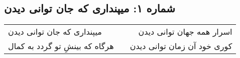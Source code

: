 \begin{center}
\section*{شماره ۱: میپنداری که جان توانی دیدن}
\label{sec:001}
\begin{longtable}{l p{0.5cm} r}
میپنداری که جان توانی دیدن
&&
اسرار همه جهان توانی دیدن
\\
هرگاه که بینشِ تو گردد به کمال
&&
کوری خود آن زمان توانی دیدن
\\
\end{longtable}
\end{center}
